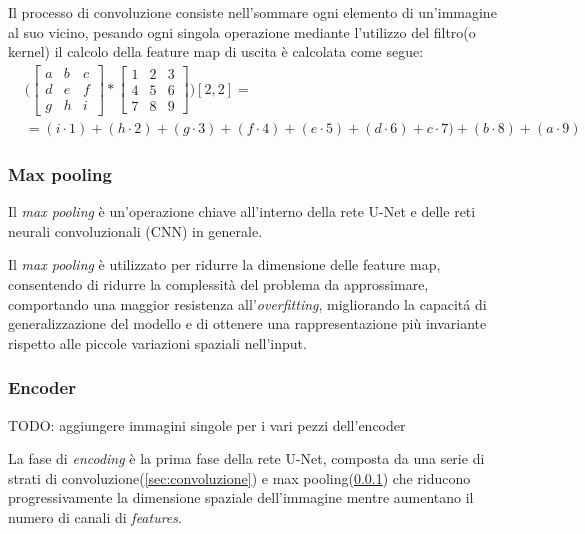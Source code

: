 Il processo di convoluzione consiste nell'sommare ogni elemento di un'immagine al suo vicino, pesando ogni singola operazione mediante l'utilizzo del filtro(o kernel) il calcolo della feature map di uscita è calcolata come segue:
\begin{align}
  &\Bigg( \begin{bmatrix}
    a & b & c \\
    d & e & f \\
    g & h & i
  \end{bmatrix}
  *
  \begin{bmatrix}
    1 & 2 & 3 \\
    4 & 5 & 6 \\
    7 & 8 & 9
  \end{bmatrix}
  \Bigg) [2, 2] =\\
  &= (i \cdot 1) + (h \cdot 2) + (g \cdot 3) + (f \cdot 4) + ( e \cdot 5 ) + ( d \cdot 6 ) + c \cdot 7) + (b \cdot 8) + (a \cdot 9)
\end{align}



\subsubsection{Max pooling} %
\label{sec:Max pooling}
Il \textit{max pooling} è un'operazione chiave all'interno della rete U-Net e delle reti neurali convoluzionali (CNN) in generale.

Il \textit{max pooling} è utilizzato per ridurre la dimensione delle feature map, consentendo di ridurre la complessità del problema da approssimare, comportando una maggior resistenza all'\textit{overfitting}, migliorando la capacit\'a di generalizzazione del modello e di ottenere una rappresentazione più invariante rispetto alle piccole variazioni spaziali nell'input.



\subsubsection{Encoder} %
\label{sec:Encoder}

TODO: aggiungere immagini singole per i vari pezzi dell'encoder

La fase di \textit{encoding} è la prima fase della rete U-Net, composta da una serie di strati di convoluzione(\ref{sec:convoluzione}) e max pooling(\ref{sec:Max pooling}) che riducono progressivamente la dimensione spaziale dell'immagine mentre aumentano il numero di canali di \textit{features}.

